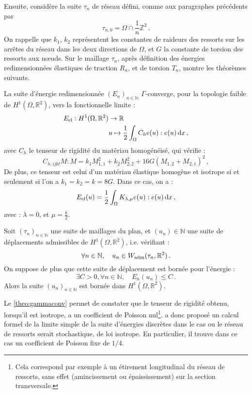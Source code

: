 Ensuite, \citeauthor{balasoiu2020halthesis} considère la suite $\tau_n$ de réseau défini, comme aux paragraphes précédents par 
$$
\tau_{n,0} = \Omega \cap \frac{1}{n} \mathbb{Z}^2 \,.
$$
On rappelle que $k_1$, $k_2$ représentent les constantes de raideurs des ressorts sur les arrêtes du réseau dans les deux directions de $\Omega$, et $G$ la constante de torsion des ressorts aux n\oe{}uds. Sur le maillage $\tau_n$, après définition des énergies redimensionnées élastiques de traction $R_n$, et de torsion $T_n$, \parencite[p.91]{balasoiu2020halthesis} montre les théorèmes suivants. 

\begin{theorem}
    \label{theo:gammaconv}
    La suite d'énergie redimensionnée $(E_n)_{n\in\mathbb{N}}$ $\Gamma$-converge, pour la topologie faible de $H^1(\Omega, \mathbb{R}^2)$, vers la fonctionnelle limite :
    \begin{align*}
        \eel : H^1(\Omega, \mathbb{R}^2) &\rightarrow \mathbb{R} \\
        &u \mapsto \frac{1}{2} \int_{\Omega} C_h e(u):e(u) \diff x \,,
    \end{align*}
    avec $C_h$ le tenseur de rigidité du matériau homogénéisé, qui vérifie :
    $$
    C_{h,ijkl}M:M = k_1 M^2_{1,1} + k_2 M^2_{2,2} + 16G(M_{1,2} + M_{2,1})^2 \,,
    $$
    De plus, ce tenseur est celui d’un matériau élastique homogène et isotrope si et seulement si l’on a $k_1 = k_2 = k = 8G$. Dans ce cas, on a :
    $$
    \eel(u) = \frac{1}{2} \int_{\Omega} K_{\lambda, \mu}e(u) : e(u) \diff x \,,
    $$
    avec :
    $\lambda = 0$, et $\mu = \frac{k}{2}$.
\end{theorem}


\begin{theorem}
    Soit $(\tau_n)_{n\in\mathbb{N}}$ une suite de maillages du plan, et $(u_n) \in \mathbb{N}$ une suite de déplacements admissibles de $H^1(\Omega, \mathbb{R}^2)$, i.e. vérifiant :
    $$
        \forall n \in \mathbb{N}, \quad u_n \in W_{\text{adm}} (\tau_n, \mathbb{R}^2) \,.
    $$
    On suppose de plus que cette suite de déplacement est bornée pour l’énergie :
    $$
    \exists C > 0 , \forall n \in \mathbb{N}, \quad E_{n}(u_n) \leq C \,.
    $$
    Alors la suite $(u_n)_{n \in \mathbb{N}}$ est bornée dans $H^1(\Omega, \mathbb{R}^2)$.
\end{theorem}

Le \cref{theo:gammaconv} permet de constater que le tenseur de rigidité obtenu, lorsqu’il est isotrope, a un coefficient de Poisson nul\footnote{Cela correspond par exemple à un étirement longitudinal du réseau de ressorts, sans effet (amincissement ou épaississement) sur la section transversale.}. \citeauthor{balasoiu2020halthesis} a donc proposé un calcul formel de la limite simple de la suite d’énergies discrètes dans le cas ou le réseau de ressorts serait stochastique, de loi isotrope. En particulier, il trouve dans ce cas un coefficient de Poisson fixe de $1/4$.




